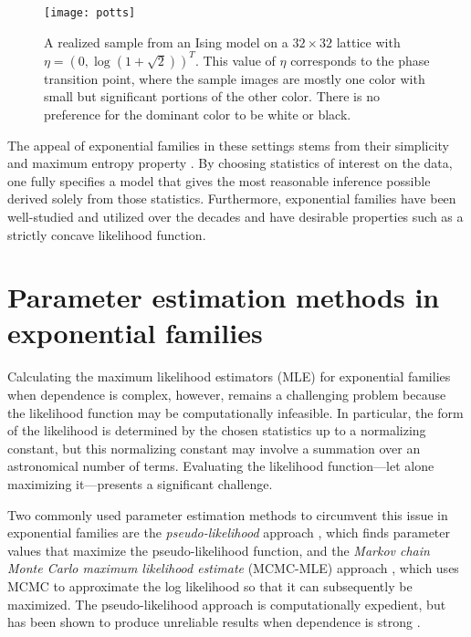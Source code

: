 \documentclass[oneside]{myumnStatThesis}
\begin{document}
\begin{figure}
\begin{center}
\texttt{[image: potts]}
\end{center}
\caption{A realized sample from an Ising model on a $32 \times 32$ lattice with $\eta = \left(0, \log(1 + \sqrt{2}) 
\right)^T$.  This value of $\eta$ corresponds to the phase transition point, where the sample images are mostly one 
color with small but significant portions of the other color.  There is no preference for the dominant color to be 
white or black.}
\label{F:pottsimage}
\end{figure}

The appeal of exponential families in these settings stems from their simplicity and maximum entropy property \citep{Jaynes:1978,Geyer:1992}.
By choosing statistics of interest on the data, one fully specifies a model that gives the 
most reasonable inference possible derived solely from those statistics.  Furthermore, exponential families have been 
well-studied \citep{Barndorff,Brown:1986} and utilized over the decades and have desirable properties such as a 
strictly concave likelihood function.

\section{Parameter estimation methods in exponential families}
Calculating the maximum likelihood estimators (MLE) for exponential families when dependence is complex, however, 
remains a challenging problem because the likelihood function may be computationally infeasible.  In particular, the 
form of the likelihood is determined by the chosen statistics up to a normalizing constant, but this normalizing 
constant may involve a summation over an astronomical number of terms.  Evaluating the likelihood function---let alone 
maximizing it---presents a significant challenge.
  
Two commonly used parameter estimation methods to circumvent this issue in exponential families are the \emph{pseudo-likelihood}
approach \citep{Besag:1975,Strauss:1990,Composite}, which finds parameter values that maximize the pseudo-likelihood function,
and the \emph{Markov chain Monte Carlo maximum likelihood estimate} (MCMC-MLE) approach \citep{Geyer:1992,Geyer:1994},
which uses MCMC to approximate the log likelihood so that it can subsequently be maximized.  
The pseudo-likelihood approach is computationally expedient, but has been shown to produce unreliable results when 
dependence is strong \citep*{Geyer:1992,Duijn:2009}.  
\end{document}
